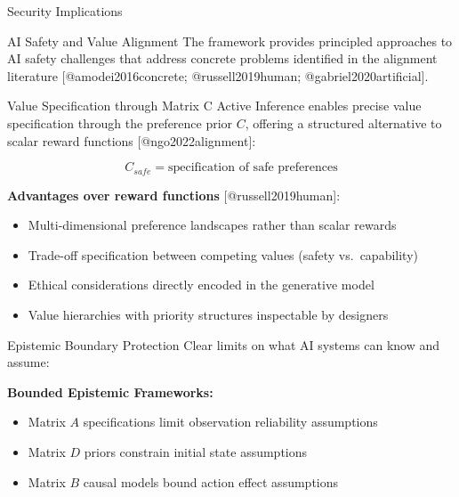 \documentclass[
  ignorenonframetext,
]{beamer}
\providecommand{\tightlist}{%
  \setlength{\itemsep}{0pt}\setlength{\parskip}{0pt}}
\begin{document}
\begin{frame}{Security Implications}
\begin{block}{AI Safety and Value Alignment}
\protect{}\label{sec:ai_safety}
The framework provides principled approaches to AI safety challenges
that address concrete problems identified in the alignment literature
{[}@amodei2016concrete; @russell2019human; @gabriel2020artificial{]}.

\begin{block}{Value Specification through Matrix C}
\protect{}\label{value-specification-through-matrix-c}
Active Inference enables precise value specification through the
preference prior \(C\), offering a structured alternative to scalar
reward functions {[}@ngo2022alignment{]}:

\begin{equation}
C_{safe} = \text{specification of safe preferences}
\label{eq:safe_preferences}
\end{equation}

\textbf{Advantages over reward functions} {[}@russell2019human{]}:

\begin{itemize}
\tightlist
\item
  Multi-dimensional preference landscapes rather than scalar rewards
\item
  Trade-off specification between competing values (safety
  vs.~capability)
\item
  Ethical considerations directly encoded in the generative model
\item
  Value hierarchies with priority structures inspectable by designers
\end{itemize}
\end{block}

\begin{block}{Epistemic Boundary Protection}
\protect{}\label{epistemic-boundary-protection}
Clear limits on what AI systems can know and assume:

\textbf{Bounded Epistemic Frameworks:}

\begin{itemize}
\tightlist
\item
  Matrix \(A\) specifications limit observation reliability assumptions
\item
  Matrix \(D\) priors constrain initial state assumptions
\item
  Matrix \(B\) causal models bound action effect assumptions
\end{itemize}
\end{block}


\end{block}
\end{frame}
\end{document}
